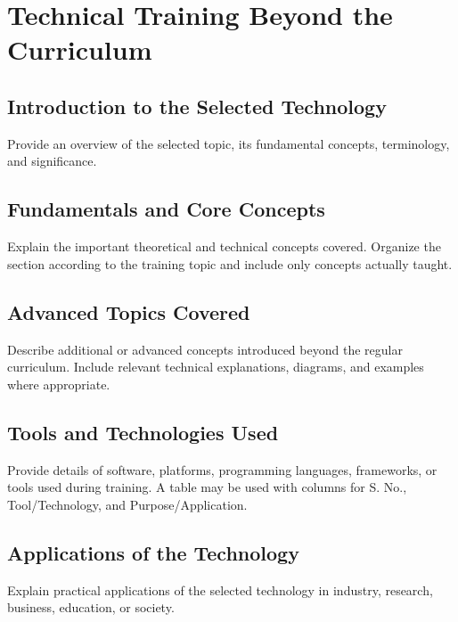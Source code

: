 \chapter{Technical Training Beyond the Curriculum}

\section{Introduction to the Selected Technology}

Provide an overview of the selected topic, its fundamental concepts, terminology, and significance.


\section{Fundamentals and Core Concepts}

Explain the important theoretical and technical concepts covered. Organize the section according to the training topic and include only concepts actually taught.


\section{Advanced Topics Covered}

Describe additional or advanced concepts introduced beyond the regular curriculum. Include relevant technical explanations, diagrams, and examples where appropriate.

\section{Tools and Technologies Used}

Provide details of software, platforms, programming languages, frameworks, or tools used during training. A table may be used with columns for S. No., Tool/Technology, and Purpose/Application.\cite{2}

\section{Applications of the Technology}

Explain practical applications of the selected technology in industry, research, business, education, or society.